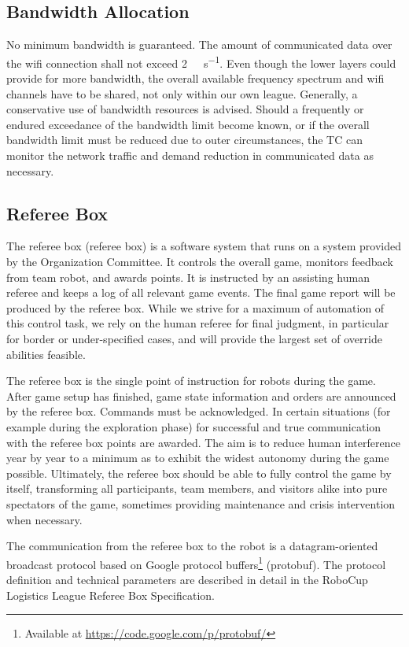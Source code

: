 \documentclass[12pt,twoside]{article}
\begin{document}
\subsection{Bandwidth Allocation}
\label{sec:bandwidth}
No minimum bandwidth is guaranteed. The amount of communicated data
over the wifi connection shall not exceed
\SI{2}{\mega\bit\per\second}. Even though the lower layers could
provide for more bandwidth, the overall available frequency spectrum
and wifi channels have to be shared, not only within our own
league. Generally, a conservative use of bandwidth resources is
advised. Should a frequently or endured exceedance of the bandwidth
limit become known, or if the overall bandwidth limit must be reduced
due to outer circumstances, the TC can monitor the network traffic and
demand reduction in communicated data as necessary.

\subsection{Referee Box}
\label{sec:referee box}
The referee box (referee box) is a software system that runs on a system
provided by the Organization Committee. It controls the overall game,
monitors feedback from team robot, and awards points. It is instructed
by an assisting human referee and keeps a log of all relevant game
events. The final game report will be produced by the referee box. While we
strive for a maximum of automation of this control task, we rely on
the human referee for final judgment, in particular for border or
under-specified cases, and will provide the largest set of override
abilities feasible.

The referee box is the single point of instruction for robots during the
game. After game setup has finished, game state information and orders
are announced by the referee box. Commands must be acknowledged. In certain
situations (for example during the exploration phase) for successful
and true communication with the referee box points are awarded. The aim is
to reduce human interference year by year to a minimum as to exhibit
the widest autonomy during the game possible. Ultimately, the referee box
should be able to fully control the game by itself, transforming all
participants, team members, and visitors alike into pure spectators of
the game, sometimes providing maintenance and crisis intervention when
necessary.

The communication from the referee box to the robot is a datagram-oriented
broadcast protocol based on Google protocol buffers\footnote{Available
  at \url{https://code.google.com/p/protobuf/}} (protobuf). The
protocol definition and technical parameters are described in detail
in the RoboCup Logistics League Referee Box Specification.
\end{document}

